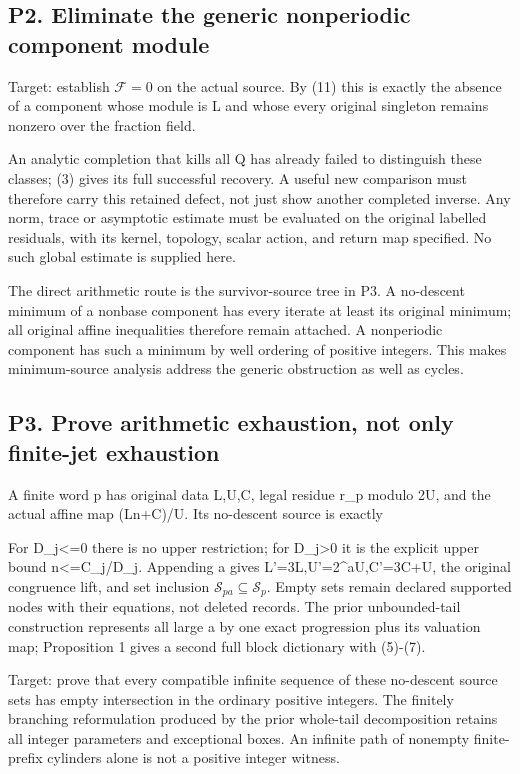 \subsection{P2. Eliminate the generic nonperiodic component module}

Target: establish \(\mathcal F=0\) on the actual source. By (11) this is
exactly the absence of a component whose module is L and whose every
original singleton remains nonzero over the fraction field.

An analytic completion that kills all Q has already failed to
distinguish these classes; (3) gives its full successful recovery. A
useful new comparison must therefore carry this retained defect, not
just show another completed inverse. Any norm, trace or asymptotic
estimate must be evaluated on the original labelled residuals, with its
kernel, topology, scalar action, and return map specified. No such
global estimate is supplied here.

The direct arithmetic route is the survivor-source tree in P3. A
no-descent minimum of a nonbase component has every iterate at least its
original minimum; all original affine inequalities therefore remain
attached. A nonperiodic component has such a minimum by well ordering of
positive integers. This makes minimum-source analysis address the
generic obstruction as well as cycles.

\subsection{P3. Prove arithmetic exhaustion, not only finite-jet
exhaustion}

A finite word p has original data L,U,C, legal residue r\_p modulo 2U,
and the actual affine map (Ln+C)/U. Its no-descent source is exactly


For D\_j\textless=0 there is no upper restriction; for D\_j\textgreater0
it is the explicit upper bound n\textless=C\_j/D\_j. Appending a gives
L'=3L,U'=2\^{}aU,C'=3C+U, the original congruence lift, and set
inclusion \(\mathcal S_{pa}\subseteq\mathcal S_p\). Empty sets remain
declared supported nodes with their equations, not deleted records. The
prior unbounded-tail construction represents all large a by one exact
progression plus its valuation map; Proposition 1 gives a second full
block dictionary with (5)-(7).

Target: prove that every compatible infinite sequence of these
no-descent source sets has empty intersection in the ordinary positive
integers. The finitely branching reformulation produced by the prior
whole-tail decomposition retains all integer parameters and exceptional
boxes. An infinite path of nonempty finite-prefix cylinders alone is not
a positive integer witness.

